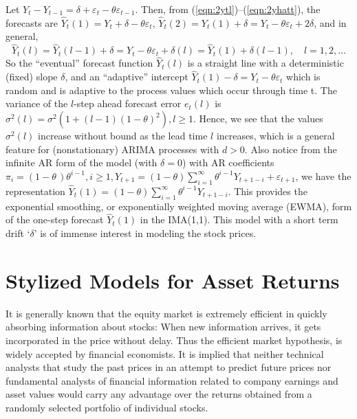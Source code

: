 \begin{ex}
 Let $Y_t - Y_{t-1} = \delta + \varepsilon_t - \theta\varepsilon_{t-1}$. Then, from (\ref{eqn:2ytl})--(\ref{eqn:2yhatt}), the forecasts are $\hat{Y}_t(1) = Y_t + \delta -\theta\varepsilon_t$, $\hat{Y}_t(2) = Y_t(1) + \delta = Y_t -\theta\varepsilon_t + 2\delta$, and in general,
	\[
	\hat{Y}_t(l) = \hat{Y}_t(l-1) + \delta = Y_t - \theta\varepsilon_t + \delta(l) = \hat{Y}_t(1) + \delta(l-1),\quad l= 1,2,\ldots
	\]
So the ``eventual'' forecast function $\hat{Y}_t(l)$ is a straight line with a deterministic (fixed) slope $\delta$, and an ``adaptive'' intercept $\hat{Y}_t(1) - \delta = Y_t - \theta\varepsilon_t$ which is random and is adaptive to the process values which occur through time t. The variance of the $l$-step ahead forecast error $e_t(l)$ is $\sigma^2(l) = \sigma^2(1 + (l-1)(1-\theta)^2), l\geq1$. Hence, we see that the values $\sigma^2(l)$ increase without bound as the lead time $l$ increases, which is a general feature for (nonstationary) ARIMA processes with $d > 0$. Also notice from the infinite AR form of the model (with $\delta = 0$) with AR coefficients $\pi_i = (1-\theta\,)\theta^{i-1}, i\geq1, Y_{t+1} = (1-\theta)\sum_{i=1}^\infty\theta^{i-1}Y_{t+1-i} + \varepsilon_{t+1}$, we have the representation $\hat{Y}_t(1) = (1-\theta)\sum_{i=1}^\infty\theta^{i-1}Y_{t+1-i}$. This provides the exponential smoothing, or exponentially weighted moving average (EWMA), form of the one-step forecast $\hat{Y}_t(1)$ in the IMA(1,1). This model with a short term drift `$\delta$' is of immense interest in modeling the stock prices.
\end{ex}



\section{Stylized Models for Asset Returns}


It is generally known that the equity market is extremely efficient in quickly absorbing information about stocks: When new information arrives, it gets incorporated in the price without delay. Thus the efficient market hypothesis, is widely accepted by financial economists. It is implied that neither technical analysts that study the past prices in an attempt to predict future prices nor fundamental analysts of financial information related to company earnings and asset values would carry any advantage over the returns obtained from a randomly selected portfolio of individual stocks.



